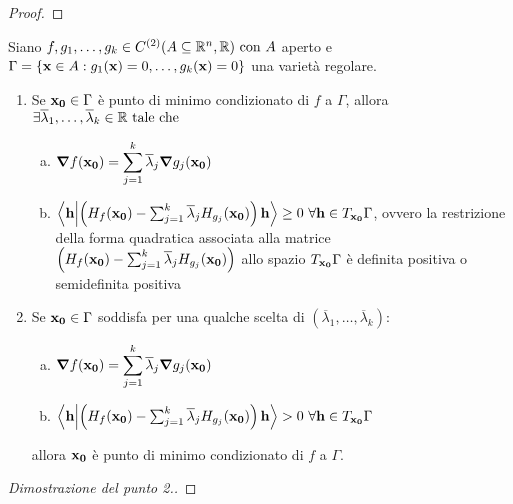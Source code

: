 \begin{proof}
    
\end{proof}

\begin{theorem}
    Siano $f,g_1,\dots,g_k \in C^{(2)}(A\subseteq\mathbb{R}^n, \mathbb{R}) \text{ con } A$ aperto e $\Gamma = \{ \vb{x} \in A: g_1 (\vb{x})=0, \dots, g_k(\vb{x})=0 \}$ una varietà regolare.
    \begin{enumerate}
        \item Se $\vb{x_0} \in \Gamma$ è punto di minimo condizionato di $f$ a $\Gamma$, allora $\exists \overline{\lambda}_1,\dots,\overline{\lambda}_k \in \mathbb{R} \text{ tale che }$
        \begin{enumerate}[a.]
            \item $\grad f(\vb{x_0})=\displaystyle \sum_{j=1}^k \overline{\lambda}_j \grad g_j(\vb{x_0})$
            \item $\innerproduct{\vb{h}}{\left( H_f(\vb{x_0})-\sum_{j=1}^k\overline{\lambda}_j H_{g_j}(\vb{x_0}) \right)\vb{h}} \geq 0 \ \forall \vb{h} \in T_{\vb{x_0}}\Gamma$, ovvero la restrizione della forma quadratica associata alla matrice $\left( H_f(\vb{x_0})-\sum_{j=1}^k\overline{\lambda}_j H_{g_j}(\vb{x_0}) \right)$ allo spazio $T_{\vb{x_0}}\Gamma$ è definita positiva o semidefinita positiva 
        \end{enumerate}
        \item Se $\vb{x_0} \in \Gamma$ soddisfa per una qualche scelta di $(\overline{\lambda}_1,\dots,\overline{\lambda}_k)$:
        \begin{enumerate}[a.]
            \item $\grad f(\vb{x_0})=\displaystyle\sum_{j=1}^k\overline{\lambda}_j \grad g_j (\vb{x_0})$
            \item $\innerproduct{\vb{h}}{\left( H_f(\vb{x_0})-\sum_{j=1}^k\overline{\lambda}_j H_{g_j}(\vb{x_0}) \right)\vb{h}} > 0 \ \forall \vb{h} \in T_{\vb{x_0}}\Gamma$
        \end{enumerate}
        allora $\vb{x_0}$ è punto di minimo condizionato di $f$ a $\Gamma$.
    \end{enumerate}
\end{theorem}

\begin{proof}
    [Dimostrazione del punto 2.]
\end{proof}